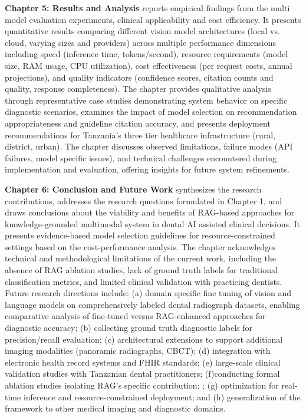 \documentclass[12pt,a4paper]{report}
\begin{document}
	\textbf{Chapter 5: Results and Analysis} reports empirical findings from the multi model evaluation experiments, clinical applicability and cost efficiency. It presents quantitative results comparing different vision model architectures (local vs. cloud, varying sizes and providers) across multiple performance dimensions including speed (inference time, tokens/second), resource requirements (model size, RAM usage, CPU utilization), cost effectiveness (per request costs, annual projections), and quality indicators (confidence scores, citation counts and quality, response completeness). The chapter provides qualitative analysis through representative case studies demonstrating system behavior on specific diagnostic scenarios, examines the impact of model selection on recommendation appropriateness and guideline citation accuracy, and presents deployment recommendations for Tanzania's three tier healthcare infrastructure (rural, district, urban). The chapter discusses observed limitations, failure modes (API failures, model specific issues), and technical challenges encountered during implementation and evaluation, offering insights for future system refinements.
	
	\textbf{Chapter 6: Conclusion and Future Work} synthesizes the research contributions, addresses the research questions formulated in Chapter 1, and draws conclusions about the viability and benefits of RAG-based approaches for knowledge-grounded multimodal system in dental AI assisted clinical decisions. It presents evidence-based model selection guidelines for resource-constrained settings based on the cost-performance analysis. The chapter acknowledges technical and methodological limitations of the current work, including the absence of RAG ablation studies, lack of ground truth labels for traditional classification metrics, and limited clinical validation with practicing dentists. Future research directions include: 
	(a) domain specific fine tuning of vision and language models on comprehensively labeled dental radiograph datasets, enabling comparative analysis of fine-tuned versus RAG-enhanced approaches for diagnostic accuracy;
	(b) collecting ground truth diagnostic labels for precision/recall evaluation; (c) architectural extensions to support additional imaging modalities (panoramic radiographs, CBCT); (d) integration with electronic health record systems and FHIR standards; (e) large-scale clinical validation studies with Tanzanian dental practitioners; (f)conducting formal ablation studies isolating RAG's specific contribution; ; (g) optimization for real-time inference and resource-constrained deployment; and (h) generalization of the framework to other medical imaging and diagnostic domains.
	
\end{document}
